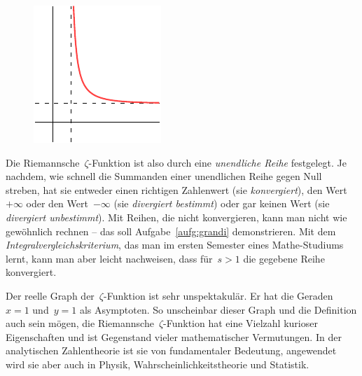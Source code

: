 \documentclass[twoside]{../zirkelblatt1415}
\theoremstyle{definition}
\theoremstyle{plain}
\theoremstyle{remark}
\begin{document}
\setlength{\wrapoverhang}{1cm}
\setlength{\columnsep}{0.5cm}
\begin{figure}
\vspace{-4em}
\includegraphics[scale=1]{zeta-function-real}
\end{figure}
Die Riemannsche~$\zeta$-Funktion ist also durch eine \emph{unendliche Reihe}
festgelegt. Je nachdem, wie schnell die Summanden einer unendlichen Reihe gegen
Null streben, hat sie entweder einen richtigen Zahlenwert (sie
\emph{konvergiert}), den Wert~$+\infty$ oder den Wert~$-\infty$ (sie
\emph{divergiert bestimmt}) oder gar keinen Wert (sie \emph{divergiert
unbestimmt}). Mit Reihen, die nicht konvergieren, kann man nicht wie gewöhnlich
rechnen -- das soll Aufgabe~\ref{aufg:grandi} demonstrieren. Mit dem
\emph{Integralvergleichskriterium}, das man im ersten Semester eines
Mathe-Studiums lernt, kann man aber leicht nachweisen, dass für~$s > 1$ die
gegebene Reihe konvergiert.

Der reelle Graph der~$\zeta$-Funktion ist sehr unspektakulär. Er hat
die Geraden~$x = 1$ und~$y = 1$ als Asymptoten.
So unscheinbar dieser Graph und die Definition auch sein mögen, die Riemannsche~$\zeta$-Funktion
hat eine Vielzahl kurioser Eigenschaften und ist Gegenstand vieler
mathematischer Vermutungen. In der analytischen Zahlentheorie ist sie von
fundamentaler Bedeutung, angewendet wird sie aber auch in Physik,
Wahrscheinlichkeitstheorie und Statistik.
\end{document}
